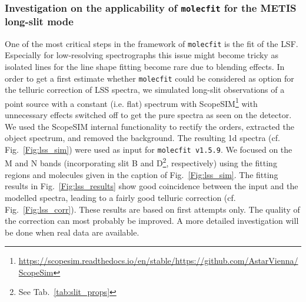 \subsubsection{Investigation on the applicability of \texttt{molecfit} for the METIS long-slit mode}
One of the most critical steps in the framework of \texttt{molecfit} is the fit of the \ac{LSF}. Especially for low-resolving spectrographs this issue might become tricky as isolated lines for the line shape fitting become rare due to blending effects. In order to get a first estimate whether \texttt{molecfit} could be considered as option for the telluric correction of \ac{LSS} spectra, we simulated long-slit observations of a point source with a constant (i.e. flat) spectrum with ScopeSIM\footnote{\url{https://scopesim.readthedocs.io/en/stable/}\newline\url{https://github.com/AstarVienna/ScopeSim}} with unnecessary effects switched off to get the pure spectra as seen on the detector. We used the ScopeSIM internal functionality to rectify the orders, extracted the object spectrum, and removed the background. The resulting 1d spectra (cf. Fig.~\ref{Fig:lss_sim}) were used as input for \texttt{molecfit v1.5.9}. We focused on the M and N bands (incorporating slit B and D\footnote{See Tab.~\ref{tab:slit_props}}, respectively) using the fitting regions and molecules given in the caption of Fig.~\ref{Fig:lss_sim}. The fitting results in Fig.~\ref{Fig:lss_results} show good coincidence between the input and the modelled spectra, leading to a fairly good telluric correction (cf. Fig.~\ref{Fig:lss_corr}). These results are based on first attempts only. The quality of the correction can most probably be improved. A more detailed investigation will be done when real data are available. \\

